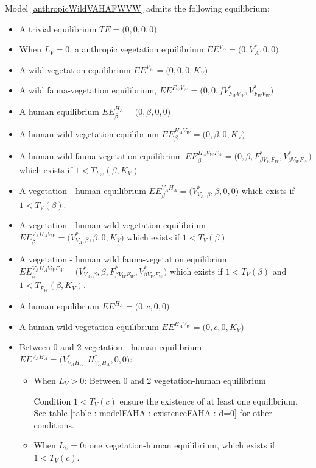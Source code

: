 \documentclass{article}
\begin{document}
Model \eqref{anthropicWildVAHAFWVW} admits the following equilibrium:
\begin{itemize}
\item A trivial equilibrium $TE = \Big(0,0,0,0\Big)$
\item When $L_V = 0$, a anthropic vegetation equilibrium $EE^{V_A} = \Big(0,V_A^*,0,0\Big)$
\item A wild vegetation equilibrium $EE^{V_W} = \Big(0,0,0 ,K_V\Big)$
\item A wild fauna-vegetation equilibrium, $EE^{F_WV_W} = \Big(0,0, fV^*_{F_WV_W},V^*_{F_WV_W}\Big)$
\item A human equilibrium $EE^{H_A}_\beta = \Big(0, \beta,0,0\Big)$
\item A human wild-vegetation equilibrium $EE^{H_AV_W}_\beta = \Big(0, \beta,0, K_V\Big)$
\item A human wild fauna-vegetation equilibrium $EE^{H_AV_WF_W}_\beta = \Big(0, \beta,F_{\beta V_WF_W}^*,V_{\beta V_WF_W}^*\Big)$ which exists if $ 1 < T_{F_W}(\beta, K_V)$
\item A vegetation - human equilibrium $EE^{V_AH_A}_\beta = \Big(V^*_{V_A, \beta}, \beta,0, 0\Big)$
which exists if $1 < T_V(\beta)$.
\item A vegetation - human wild-vegetation equilibrium $EE^{V_AH_AV_W}_\beta = \Big(V^*_{V_A, \beta}, \beta,0, K_V\Big)$
which exists if $1 < T_V(\beta)$.

\item A vegetation - human wild fauna-vegetation equilibrium $EE^{V_AH_AV_WF_W}_\beta = \Big(V^*_{V_A, \beta}, \beta,F_{\beta V_WF_W}^*,V_{\beta V_WF_W}^*\Big)$
which exists if $1 < T_V(\beta)$ and $ 1 < T_{F_W}(\beta, K_V)$.

\item A human equilibrium $EE^{H_A} = \Big(0, c, 0, 0\Big)$
\item A human wild-vegetation equilibrium $EE^{H_AV_W} = \Big(0, c, 0, K_V\Big)$
\item Between 0 and 2 vegetation - human equilibrium $EE^{V_AH_A} = \Big( V^*_{V_AH_A}, H^*_{V_AH_A},0,0\Big)$:

\begin{itemize}
\item When $L_V > 0$: Between 0 and 2 vegetation-human equilibrium
 
Condition $1 < T_V(c)$ ensure the existence of at least one equilibrium. See table \ref{table : modelFAHA : existenceFAHA : d=0} for other conditions.
 \item When $L_V = 0$: one vegetation-human equilibrium, which exists if $1 < T_V(c)$.
 \end{itemize}
 

\end{itemize}
\end{document}
